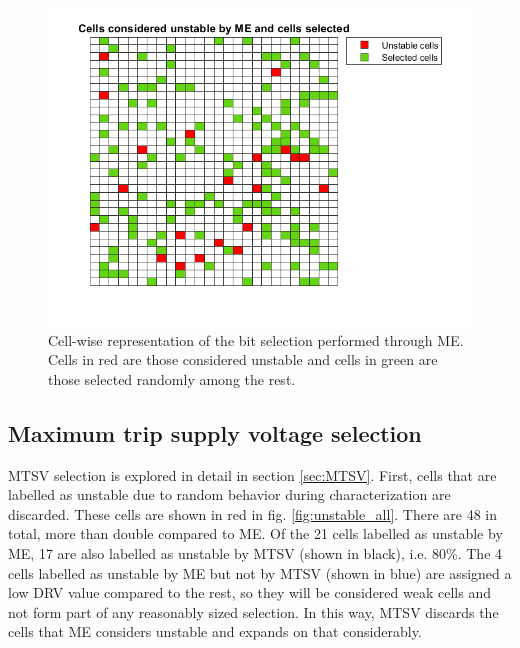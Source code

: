 \begin{figure}[H]
    \centering
    \includegraphics[width=14cm]{images/MEselection.png}
    \caption{Cell-wise representation of the bit selection performed through ME. Cells in red are those considered unstable and cells in green are those selected randomly among the rest.}
    \label{fig:MEselection}
\end{figure}

\subsection{Maximum trip supply voltage selection}

 MTSV selection is explored in detail in section \ref{sec:MTSV}. First, cells that are labelled as unstable due to random behavior during characterization are discarded. These cells are shown in red in fig. \ref{fig:unstable_all}. There are 48 in total, more than double compared to ME. Of the 21 cells labelled as unstable by ME, 17 are also labelled as unstable by MTSV (shown in black), i.e. 80\%. The 4 cells labelled as unstable by ME but not by MTSV (shown in blue) are assigned a low DRV value compared to the rest, so they will be considered weak cells and not form part of any reasonably sized selection. In this way, MTSV discards the cells that ME considers unstable and expands on that considerably.  
 
